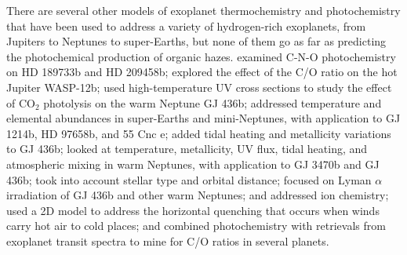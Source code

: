 \documentclass[preprint]{aastex}
\begin{document}
There are several other models of exoplanet thermochemistry and photochemistry that have been 
used to address a variety of hydrogen-rich exoplanets, from Jupiters to Neptunes to super-Earths,
but none of them go as far as predicting the photochemical production of organic hazes.
\citet{Venot2012} examined C-N-O photochemistry on HD 189733b and HD 209458b; 
\citet{Kopparapu2012} explored the effect of the C/O ratio on the hot Jupiter WASP-12b;
\citet{Venot2013} used high-temperature UV cross sections to study the effect of CO$_2$ photolysis on the warm Neptune GJ 436b;
\cite{Hu2014} addressed temperature and elemental abundances in super-Earths and mini-Neptunes, with application to GJ 1214b, HD 97658b, and 55 Cnc e; 
\citet{Agundez2014b} added tidal heating and metallicity variations to GJ 436b;
\citet{Venot2014} looked at temperature, metallicity, UV flux, tidal heating, and atmospheric mixing in warm Neptunes, with application to GJ 3470b and GJ 436b;
\cite{Miguel2014} took into account stellar type and orbital distance; 
\cite{Miguel2015} focused on Lyman $\alpha$ irradiation of GJ 436b and other warm Neptunes;
\citet{Koskinen2013} and \citet{Lavvas2014} addressed ion chemistry;
\citet{Agundez2012,Agundez2014a} used a 2D model to address the horizontal quenching that occurs when winds carry hot air to cold places;
and \citet{Benneke2015} combined photochemistry with retrievals from exoplanet transit spectra to mine for C/O ratios in several planets. 
\end{document}
